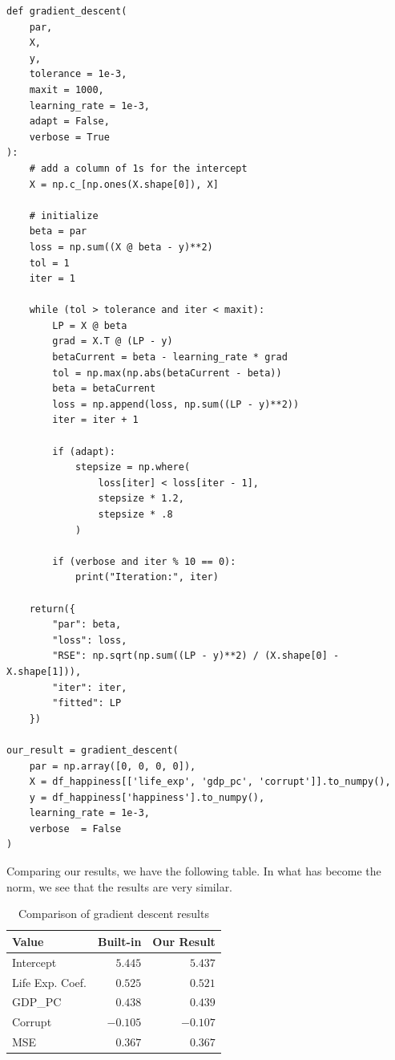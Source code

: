 \documentclass[
  letterpaper,
]{krantz}
\begin{document}
\begin{verbatim}
def gradient_descent(
    par, 
    X, 
    y, 
    tolerance = 1e-3, 
    maxit = 1000, 
    learning_rate = 1e-3, 
    adapt = False, 
    verbose = True
):
    # add a column of 1s for the intercept
    X = np.c_[np.ones(X.shape[0]), X]
    
    # initialize
    beta = par
    loss = np.sum((X @ beta - y)**2)
    tol = 1
    iter = 1

    while (tol > tolerance and iter < maxit):
        LP = X @ beta
        grad = X.T @ (LP - y)
        betaCurrent = beta - learning_rate * grad
        tol = np.max(np.abs(betaCurrent - beta))
        beta = betaCurrent
        loss = np.append(loss, np.sum((LP - y)**2))
        iter = iter + 1

        if (adapt):
            stepsize = np.where(
                loss[iter] < loss[iter - 1], 
                stepsize * 1.2, 
                stepsize * .8
            )

        if (verbose and iter % 10 == 0):
            print("Iteration:", iter)

    return({
        "par": beta,
        "loss": loss,
        "RSE": np.sqrt(np.sum((LP - y)**2) / (X.shape[0] - X.shape[1])),
        "iter": iter,
        "fitted": LP
    })

our_result = gradient_descent(
    par = np.array([0, 0, 0, 0]),
    X = df_happiness[['life_exp', 'gdp_pc', 'corrupt']].to_numpy(),
    y = df_happiness['happiness'].to_numpy(),
    learning_rate = 1e-3,
    verbose  = False
)
\end{verbatim}

Comparing our results, we have the following table. In what has become
the norm, we see that the results are very similar.

\begin{longtable}{lrr}

\caption{\label{tbl-gradient-descent}Comparison of gradient descent
results}

\tabularnewline

\toprule
Value & Built-in & Our Result \\ 
\midrule\addlinespace[2.5pt]
Intercept & \textcolor[HTML]{404040}{$5.445$} & \textcolor[HTML]{404040}{$5.437$} \\ 
Life Exp. Coef. & \textcolor[HTML]{404040}{$0.525$} & \textcolor[HTML]{404040}{$0.521$} \\ 
GDP\_PC & \textcolor[HTML]{404040}{$0.438$} & \textcolor[HTML]{404040}{$0.439$} \\ 
Corrupt & \textcolor[HTML]{404040}{$-0.105$} & \textcolor[HTML]{404040}{$-0.107$} \\ 
MSE & \textcolor[HTML]{404040}{$0.367$} & \textcolor[HTML]{404040}{$0.367$} \\ 
\bottomrule

\end{longtable}
\end{document}
